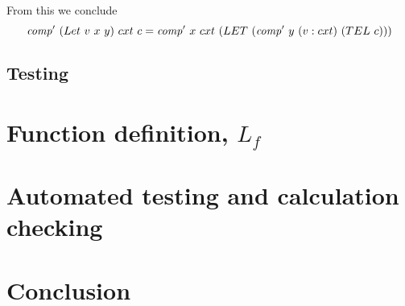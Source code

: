 \documentclass {article}
\begin{document}
From this we conclude
\[ \Compp  (Let\ v\ x\ y)\ cxt\ c
		= \Compp  x\ cxt\ (LET\ (\Compp  y\ (v:cxt)\ (TEL\ c))) \]

\subsection{Testing}

\pagebreak
\section{Function definition, $L_f$} \label{langfunc}

\pagebreak
\section{Automated testing and calculation checking} \label{autotesting}

\pagebreak
\section{Conclusion} \label{conclusion}










\end{document}
